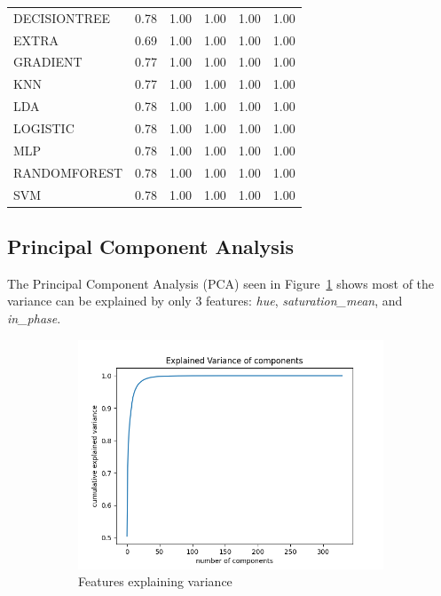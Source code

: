 \documentclass[letterpaper]{article}
\begin{document}
{\begin{tiny}
\begin{longtable}{lcrrrr}
\bottomrule
\endlastfoot
DECISIONTREE & 0.78 &      1.00 & 1.00 &       1.00 &       1.00 \\
       EXTRA & 0.69 &      1.00 & 1.00 &       1.00 &       1.00 \\
    GRADIENT & 0.77 &      1.00 & 1.00 &       1.00 &       1.00 \\
         KNN & 0.77 &      1.00 & 1.00 &       1.00 &       1.00 \\
         LDA & 0.78 &      1.00 & 1.00 &       1.00 &       1.00 \\
    LOGISTIC & 0.78 &      1.00 & 1.00 &       1.00 &       1.00 \\
         MLP & 0.78 &      1.00 & 1.00 &       1.00 &       1.00 \\
RANDOMFOREST & 0.78 &      1.00 & 1.00 &       1.00 &       1.00 \\
         SVM & 0.78 &      1.00 & 1.00 &       1.00 &       1.00 \\
\end{longtable}


\end{tiny}
 
\subsection{Principal Component Analysis}
The Principal Component Analysis (PCA) \parencite{Muller2016-ui} seen in Figure~\ref{fig:pca} shows most of the variance can be explained by only 3 features: \textit{hue}, \textit{saturation\_mean}, and \textit{in\_phase}.
\begin{figure}[h]
	\centering
	\begin{subfigure}[h]{.48\textwidth}
		  \centering
		  \includegraphics[width=1\linewidth]{figures/pca.png}
		  \caption{Features explaining variance}
		  \label{fig:pca}
	\end{subfigure}
	\begin{subfigure}[h]{.32\textwidth}
	  \centering
	  	

\end{subfigure}
\end{figure}}
\end{document}
